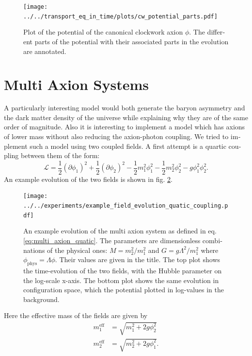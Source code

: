 \documentclass[master,       %
               twoside,        %
               BCOR10mm,       %
               english,ngerman, %
               ]{GAUBM}
\begin{document}
\begin{otherlanguage}{english}
\begin{figure}[H]
	\texttt{[image: ../../transport\_eq\_in\_time/plots/cw\_potential\_parts.pdf]}
	\caption{Plot of the potential of the canonical clockwork axion $\phi$. The different parts of the potential with their associated parts in the evolution are annotated.}
	\label{fig:clockwork_potential_parts}
\end{figure}


\section{Multi Axion Systems}
A particularly interesting model would both generate the baryon asymmetry and the dark matter density of the universe while explaining why they are of the same order of magnitude.
Also it is interesting to implement a model which has axions of lower mass without also reducing the axion-photon coupling.
We tried to implement such a model using two coupled fields.
A first attempt is a quartic coupling between them of the form:
\begin{equation}
	\label{eq:multi_axion_quatic}
	\mathcal{L} = \frac{1}{2} (\partial \phi_1)^2 + \frac{1}{2} (\partial \phi_2)^2 - \frac{1}{2} m_1^2 \phi_1^2 - \frac{1}{2} m_2^2 \phi_2^2 - g \phi_1^2 \phi_2^2.
\end{equation}
An example evolution of the two fields is shown in fig. \ref{fig:multi_axion_quatic_evolution_example}.
\begin{figure}[H]
	\texttt{[image: ../../experiments/example\_field\_evolution\_quatic\_coupling.pdf]}
	\caption{An example evolution of the multi axion system as defined in eq. \eqref{eq:multi_axion_quatic}.
	The parameters are dimensionless combinations of the physical ones: $M = m_2^2 / m_1^2$ and $G = g \Lambda^2 / m_1^2$ where $\phi_\mathrm{phys} = \Lambda \phi$. Their values are given in the title.
	The top plot shows the time-evolution of the two fields, with the Hubble parameter on the log-scale x-axis.
	The bottom plot shows the same evolution in configuration space, which the potential plotted in log-values in the background.
	}
	\label{fig:multi_axion_quatic_evolution_example}
\end{figure}
Here the effective mass of the fields are given by
\begin{align}
	\label{eq:multi_axion_H_osc}
	m_1^\mathrm{eff} &= \sqrt{m_1^2 + 2 g \phi_2^2} \nonumber \\
	m_2^\mathrm{eff} &= \sqrt{m_2^2 + 2 g \phi_1^2}.
\end{align}

\end{otherlanguage}
\end{document}

